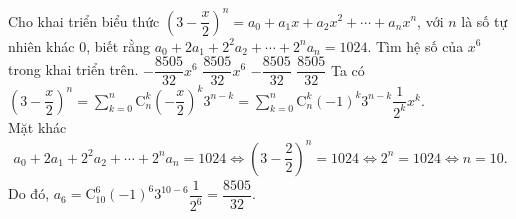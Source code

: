 \begin{ex}%
 Cho khai triển biểu thức $\left(3-\dfrac{x}{2}\right)^n = a_0+a_1x+a_2x^2+\cdots+a_nx^n$, với $n$ là số tự nhiên khác $0$, biết rằng $a_0+2a_1+2^2a_2+\cdots+2^na_n=1024$. Tìm hệ số của $x^6$ trong khai triển trên.
 \choice
  {$-\dfrac{8505}{32}x^6$}
  {$\dfrac{8505}{32}x^6$}
  {$-\dfrac{8505}{32}$}
  {\True $\dfrac{8505}{32}$}
 \loigiai
  {
  Ta có $\left(3-\dfrac{x}{2}\right)^n=\displaystyle\sum\limits_{k=0}^{n}\mathrm{C}_n^k\left(-\dfrac{x}{2}\right)^k 3^{n-k}=\displaystyle\sum\limits_{k=0}^{n}\mathrm{C}_n^k(-1)^k 3^{n-k} \dfrac{1}{2^k}x^k$.\\
  Mặt khác
  \begin{eqnarray*}
   a_0+2a_1+2^2a_2+\cdots+2^na_n=1024\Leftrightarrow \left(3-\dfrac{2}{2}\right)^n=1024\Leftrightarrow 2^n=1024\Leftrightarrow n=10.
  \end{eqnarray*}
  Do đó, $a_6=\mathrm{C}_{10}^6(-1)^6 3^{10-6}\dfrac{1}{2^6}=\dfrac{8505}{32}$.
  }
\end{ex}

